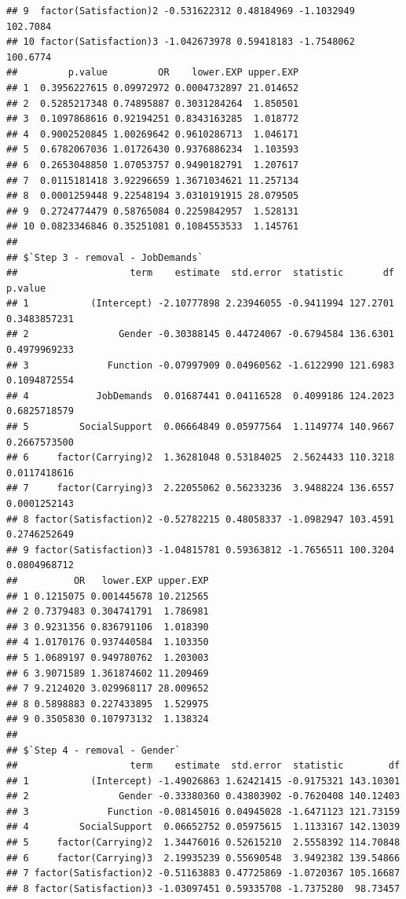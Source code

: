 \documentclass[
]{book}
\begin{document}
\begin{verbatim}
## 9  factor(Satisfaction)2 -0.531622312 0.48184969 -1.1032949 102.7084
## 10 factor(Satisfaction)3 -1.042673978 0.59418183 -1.7548062 100.6774
##         p.value         OR    lower.EXP upper.EXP
## 1  0.3956227615 0.09972972 0.0004732897 21.014652
## 2  0.5285217348 0.74895887 0.3031284264  1.850501
## 3  0.1097868616 0.92194251 0.8343163285  1.018772
## 4  0.9002520845 1.00269642 0.9610286713  1.046171
## 5  0.6782067036 1.01726430 0.9376886234  1.103593
## 6  0.2653048850 1.07053757 0.9490182791  1.207617
## 7  0.0115181418 3.92296659 1.3671034621 11.257134
## 8  0.0001259448 9.22548194 3.0310191915 28.079505
## 9  0.2724774479 0.58765084 0.2259842957  1.528131
## 10 0.0823346846 0.35251081 0.1084553533  1.145761
## 
## $`Step 3 - removal - JobDemands`
##                    term    estimate  std.error  statistic       df      p.value
## 1           (Intercept) -2.10777898 2.23946055 -0.9411994 127.2701 0.3483857231
## 2                Gender -0.30388145 0.44724067 -0.6794584 136.6301 0.4979969233
## 3              Function -0.07997909 0.04960562 -1.6122990 121.6983 0.1094872554
## 4            JobDemands  0.01687441 0.04116528  0.4099186 124.2023 0.6825718579
## 5         SocialSupport  0.06664849 0.05977564  1.1149774 140.9667 0.2667573500
## 6     factor(Carrying)2  1.36281048 0.53184025  2.5624433 110.3218 0.0117418616
## 7     factor(Carrying)3  2.22055062 0.56233236  3.9488224 136.6557 0.0001252143
## 8 factor(Satisfaction)2 -0.52782215 0.48058337 -1.0982947 103.4591 0.2746252649
## 9 factor(Satisfaction)3 -1.04815781 0.59363812 -1.7656511 100.3204 0.0804968712
##          OR   lower.EXP upper.EXP
## 1 0.1215075 0.001445678 10.212565
## 2 0.7379483 0.304741791  1.786981
## 3 0.9231356 0.836791106  1.018390
## 4 1.0170176 0.937440584  1.103350
## 5 1.0689197 0.949780762  1.203003
## 6 3.9071589 1.361874602 11.209469
## 7 9.2124020 3.029968117 28.009652
## 8 0.5898883 0.227433895  1.529975
## 9 0.3505830 0.107973132  1.138324
## 
## $`Step 4 - removal - Gender`
##                    term    estimate  std.error  statistic        df
## 1           (Intercept) -1.49026863 1.62421415 -0.9175321 143.10301
## 2                Gender -0.33380360 0.43803902 -0.7620408 140.12403
## 3              Function -0.08145016 0.04945028 -1.6471123 121.73159
## 4         SocialSupport  0.06652752 0.05975615  1.1133167 142.13039
## 5     factor(Carrying)2  1.34476016 0.52615210  2.5558392 114.70848
## 6     factor(Carrying)3  2.19935239 0.55690548  3.9492382 139.54866
## 7 factor(Satisfaction)2 -0.51163883 0.47725869 -1.0720367 105.16687
## 8 factor(Satisfaction)3 -1.03097451 0.59335708 -1.7375280  98.73457

\end{verbatim}
\end{document}
